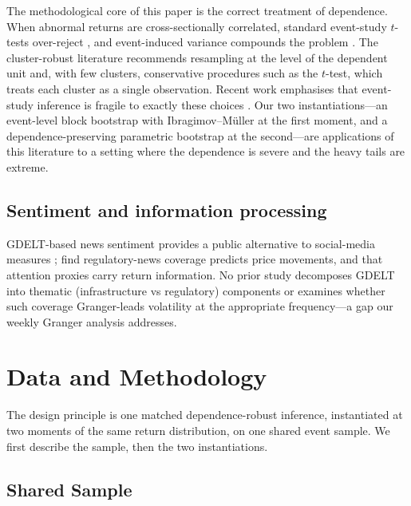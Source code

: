 \documentclass[pdflatex,sn-mathphys-num]{sn-jnl}
\theoremstyle{thmstyleone}
\theoremstyle{thmstyletwo}
\theoremstyle{thmstylethree}
\begin{document}
The methodological core of this paper is the correct treatment of dependence. When abnormal returns are cross-sectionally correlated, standard event-study $t$-tests over-reject \citep{kolari2010event}, and event-induced variance compounds the problem \citep{boehmer1991event}. The cluster-robust literature \citep{cameron2008bootstrap, petersen2009estimating, mackinnon2023cluster} recommends resampling at the level of the dependent unit and, with few clusters, conservative procedures such as the \citet{ibragimov2010tstatistic} $t$-test, which treats each cluster as a single observation. Recent work emphasises that event-study inference is fragile to exactly these choices \citep{goldsmithpinkham2025factor, casini2025shock}. Our two instantiations---an event-level block bootstrap with Ibragimov--M\"uller at the first moment, and a dependence-preserving parametric bootstrap at the second---are applications of this literature to a setting where the dependence is severe and the heavy tails are extreme.

\subsection{Sentiment and information processing}

GDELT-based news sentiment provides a public alternative to social-media measures \citep{ShenEtAl2019, PhillipsGorse2018}; \citet{FeinsteinWerbach2021} find regulatory-news coverage predicts price movements, and \citet{LiuTsyvinski2021} that attention proxies carry return information. No prior study decomposes GDELT into thematic (infrastructure vs regulatory) components or examines whether such coverage Granger-leads volatility at the appropriate frequency---a gap our weekly Granger analysis addresses.


\section{Data and Methodology}\label{sec:methods}

The design principle is one matched dependence-robust inference, instantiated at two moments of the same return distribution, on one shared event sample. We first describe the sample, then the two instantiations.

\subsection{Shared Sample}\label{sec:sample}
\end{document}
